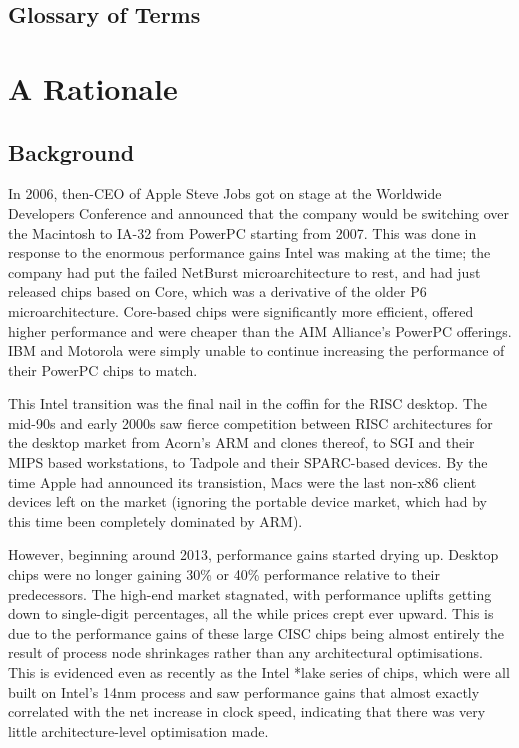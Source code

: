 \documentclass[12pt]{report}
\begin{document}
\section{Glossary of Terms}
\newpage

\chapter{A Rationale}
\newpage

\section{Background}
In 2006, then-CEO of Apple Steve Jobs got on stage at the Worldwide Developers Conference and announced that the company
would be switching over the Macintosh to IA-32 from PowerPC starting from 2007. This was done in response to the enormous
performance gains Intel was making at the time; the company had put the failed NetBurst microarchitecture to rest, and
had just released chips based on Core, which was a derivative of the older P6 microarchitecture. Core-based chips were
significantly more efficient, offered higher performance and were cheaper than the AIM Alliance's PowerPC offerings. IBM
and Motorola were simply unable to continue increasing the performance of their PowerPC chips to match.

This Intel transition was the final nail in the coffin for the RISC desktop. The mid-90s and early 2000s saw fierce
competition between RISC architectures for the desktop market from Acorn's ARM and clones thereof, to SGI and their MIPS
based workstations, to Tadpole and their SPARC-based devices. By the time Apple had announced its transistion, Macs were
the last non-x86 client devices left on the market (ignoring the portable device market, which had by this time been
completely dominated by ARM).

However, beginning around 2013, performance gains started drying up. Desktop chips were no longer gaining 30\% or 40\%
performance relative to their predecessors. The high-end market stagnated, with performance uplifts getting down to single-digit
percentages, all the while prices crept ever upward. This is due to the performance gains of these large CISC chips being
almost entirely the result of process node shrinkages rather than any architectural optimisations. This is evidenced even
as recently as the Intel *lake series of chips, which were all built on Intel's 14nm process and saw performance gains that
almost exactly correlated with the net increase in clock speed, indicating that there was very little architecture-level
optimisation made.
\end{document}
